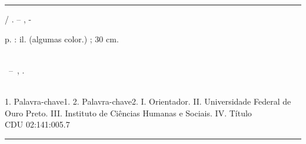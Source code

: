 \documentclass[
	12pt,				%
	openright,			%
	twoside,			%
	a4paper,			%
	english,			%
	brazil				%
	]{abntex2}
\begin{document}

\imprimirfolhaderosto*



%
%     
%
%
\begin{fichacatalografica}
	\vspace*{\fill}					%
	\hrule							%
	\begin{center}					%
	\begin{minipage}[c]{12.5cm}		%

	\imprimirautor

	\hspace{0.5cm} \imprimirtitulo  / \imprimirautor. --
	\imprimirlocal, \imprimirdata-

	\hspace{0.5cm} \pageref{LastPage} p. : il. (algumas color.) ; 30 cm.\\

	\hspace{0.5cm} \imprimirorientadorRotulo~\imprimirorientador\\

	\hspace{0.5cm}
	\parbox[t]{\textwidth}{\imprimirtipotrabalho~--~\imprimirinstituicao,
	\imprimirdata.}\\

	\hspace{0.5cm}
		1. Palavra-chave1.
		2. Palavra-chave2.
		I. Orientador.
		II. Universidade Federal de Ouro Preto.
		III. Instituto de Ciências Humanas e Sociais.
		IV. Título\\

	\hspace{8.75cm} CDU 02:141:005.7\\

	\end{minipage}
	\end{center}
	\hrule
\end{fichacatalografica}
\end{document}
